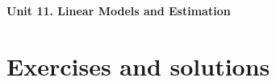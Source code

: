 \documentclass[12pt]{article}
\begin{document}
{\Large\bfseries Unit 11. Linear Models and Estimation}\par

\clearpage
\section*{Exercises and solutions}

\end{document}

